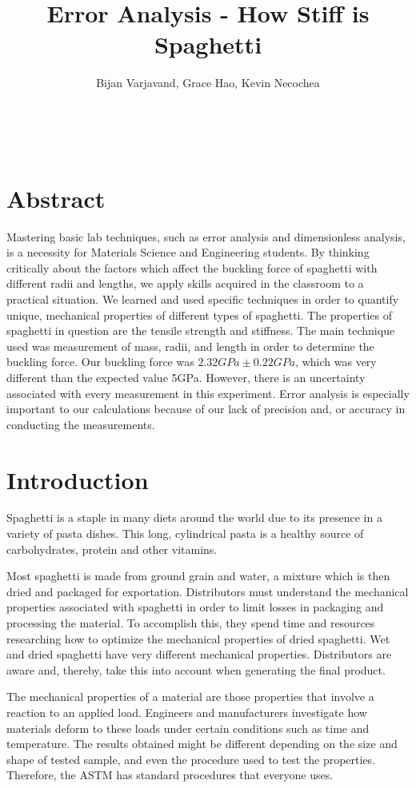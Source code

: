 \documentclass[12pt]{article}
\author{Bijan Varjavand, Grace Hao, Kevin Necochea}
\title{Error Analysis - How Stiff is Spaghetti}
\renewcommand{\baselinestretch}{1.5}
\begin{document}
\maketitle
\ \\[0.5in]
\renewcommand{\baselinestretch}{1.0}
\section{Abstract}
\centering
Mastering basic lab techniques, such as error analysis and dimensionless analysis, is a necessity for Materials Science and Engineering students. By thinking critically about the factors which affect the buckling force of spaghetti with different radii and lengths, we apply skills acquired in the classroom to a practical situation. We learned and used specific techniques in order to quantify unique, mechanical properties of different types of spaghetti. The properties of spaghetti in question are the tensile strength and stiffness. The main technique used was measurement of mass, radii, and length in order to determine the buckling force. Our buckling force was $2.32 GPa \pm 0.22 GPa$, which was very different than the expected value 5GPa. However, there is an uncertainty associated with every measurement in this experiment. Error analysis is especially important to our calculations because of our lack of precision and, or accuracy in conducting the measurements.

\clearpage

\raggedright
\linespread{1.6}
\renewcommand{\baselinestretch}{1.5}
\section{Introduction}
Spaghetti is a staple in many diets around the world due to its presence in a variety of pasta dishes. This long, cylindrical pasta is a healthy source of carbohydrates, protein and other vitamins.

Most spaghetti is made from ground grain and water, a mixture which is then dried and packaged for exportation. Distributors must understand the mechanical properties associated with spaghetti in order to limit losses in packaging and processing the material. To accomplish this, they spend time and resources researching how to optimize the mechanical properties of dried spaghetti. Wet and dried spaghetti have very different mechanical properties. Distributors are aware and, thereby, take this into account when generating the final product.

The mechanical properties of a material are those properties that involve a reaction to an applied load. Engineers and manufacturers investigate how materials deform to these loads under certain conditions such as time and temperature. The results obtained might be different depending on the size and shape of tested sample, and even the procedure used to test the properties. Therefore, the ASTM has standard procedures that everyone uses.
\end{document}
